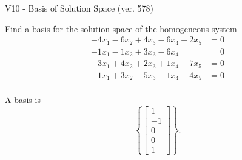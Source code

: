\begin{exercise}
  \begin{exerciseTitle}V10 - Basis of Solution Space (ver. 578)\end{exerciseTitle}
  \begin{exerciseStatement}
    Find a basis for the solution space of the homogeneous system 
\begin{align*}
 -4 x_ 1 -6 x_ 2 + 4 x_ 3 -6 x_ 4 -2 x_ 5 &= 0  \\ 
  -1 x_ 1 -1 x_ 2 + 3 x_ 3 -6 x_ 4 &= 0  \\ 
  -3 x_ 1 + 4 x_ 2 + 2 x_ 3 + 1 x_ 4 + 7 x_ 5 &= 0  \\ 
  -1 x_ 1 + 3 x_ 2 -5 x_ 3 -1 x_ 4 + 4 x_ 5 &= 0  \\ 
 \end{align*}


 
  \end{exerciseStatement}

  \begin{exerciseAnswer}
   A basis is   
\[\left\{\left[\begin{array}{c}
1 \\
-1 \\
0 \\
0 \\
1
\end{array}\right]\right\}.\]

  


  \end{exerciseAnswer}
\end{exercise}